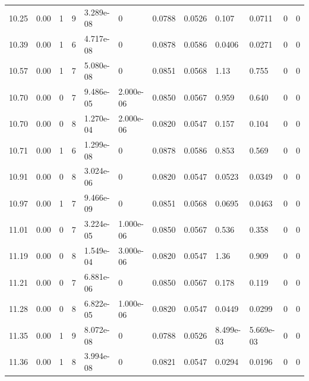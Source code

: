 \documentclass[preview]{standalone}
\begin{document}
{{{\begin{tabular}{L{1.2cm}C{1.2cm} C{0.3cm}C{0.5cm} C{1.4cm}C{1.4cm} C{1.4cm}C{1.4cm} C{1.6cm}C{1.6cm} C{1.6cm}C{1.6cm}}
  10.25  &  0.00  & 1     &  9 &  3.289e-08  & 0  &  0.0788&   0.0526& 0.107 & 0.0711   &  0 & 0  \\ 
  10.39  &  0.00  & 1     &  6 &  4.717e-08  & 0  &  0.0878&   0.0586& 0.0406 & 0.0271   &  0 & 0  \\ 
  10.57  &  0.00  & 1     &  7 &  5.080e-08  & 0  &  0.0851&   0.0568& 1.13 & 0.755   &  0 & 0  \\ 
  10.70  &  0.00  & 0     &  7 &  9.486e-05  & 2.000e-06  &  0.0850&   0.0567& 0.959 & 0.640   &  0 & 0  \\ 
  10.70  &  0.00  & 0     &  8 &  1.270e-04  & 2.000e-06  &  0.0820&   0.0547& 0.157 & 0.104   &  0 & 0  \\ 
  10.71  &  0.00  & 1     &  6 &  1.299e-08  & 0  &  0.0878&   0.0586& 0.853 & 0.569   &  0 & 0  \\ 
  10.91  &  0.00  & 0     &  8 &  3.024e-06  & 0  &  0.0820&   0.0547& 0.0523 & 0.0349   &  0 & 0  \\ 
  10.97  &  0.00  & 1     &  7 &  9.466e-09  & 0  &  0.0851&   0.0568& 0.0695 & 0.0463   &  0 & 0  \\ 
  11.01  &  0.00  & 0     &  7 &  3.224e-05  & 1.000e-06  &  0.0850&   0.0567& 0.536 & 0.358   &  0 & 0  \\ 
  11.19  &  0.00  & 0     &  8 &  1.549e-04  & 3.000e-06  &  0.0820&   0.0547& 1.36 & 0.909   &  0 & 0  \\ 
  11.21  &  0.00  & 0     &  7 &  6.881e-06  & 0  &  0.0850&   0.0567& 0.178 & 0.119   &  0 & 0  \\ 
  11.28  &  0.00  & 0     &  8 &  6.822e-05  & 1.000e-06  &  0.0820&   0.0547& 0.0449 & 0.0299   &  0 & 0  \\ 
  11.35  &  0.00  & 1     &  9 &  8.072e-08  & 0  &  0.0788&   0.0526& 8.499e-03 & 5.669e-03   &  0 & 0  \\ 
  11.36  &  0.00  & 1     &  8 &  3.994e-08  & 0  &  0.0821&   0.0547& 0.0294 & 0.0196   &  0 & 0  \\ 
\hline 
\end{tabular} 

}}}
\end{document}
